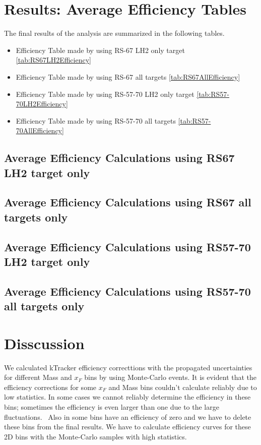 \documentclass[11pt]{article}
\begin{document}
\section{Results: Average Efficiency Tables}
The final results of the analysis are summarized in the following tables. 
\begin{itemize}
 \item Efficiency Table made by using RS-67 LH2 only target \ref{tab:RS67LH2Efficiency}
 \item Efficiency Table made by using RS-67 all targets \ref{tab:RS67AllEfficiency}
 \item Efficiency Table made by using RS-57-70 LH2 only target \ref{tab:RS57-70LH2Efficiency}
 \item Efficiency Table made by using RS-57-70 all targets \ref{tab:RS57-70AllEfficiency}
\end{itemize}

\clearpage
\subsection{Average Efficiency Calculations using RS67 LH2 target only}

\clearpage
\subsection{Average Efficiency Calculations using RS67 all targets only}

\clearpage
\subsection{Average Efficiency Calculations using RS57-70 LH2 target only}

\clearpage
\subsection{Average Efficiency Calculations using RS57-70 all targets only}


\section{Disscussion}
We calculated kTracker efficiency correcttions with the propagated uncertainties for different Mass and $x_{F}$ bins by using Monte-Carlo events. 
It is evident that the efficiency corrections for some $x_{F}$ and Mass bins couldn't calculate reliably due to low statistics. 
In some cases we cannot reliably determine the efficiency in these bins; sometimes the efficiency is even larger than one due to the large fluctuations.  
Also in some bins have an efficiency of zero and we have to delete these bins from the final results. 
We have to calculate efficiency curves for these 2D bins with the Monte-Carlo samples with high statistics.
\end{document}
